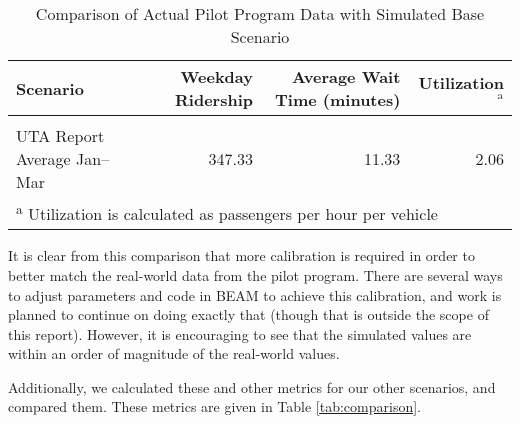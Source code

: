 \documentclass[3p, authoryear]{elsarticle} %
\begin{document}
\begin{table}[H]

\caption{\label{tab:UTAComparison}Comparison of Actual Pilot Program Data with Simulated Base Scenario}
\centering
\begin{tabular}[t]{lrrr}
\toprule
Scenario & Weekday Ridership & Average Wait Time (minutes) & Utilization$^{\text{a}}$\\
\midrule
\cellcolor{gray!6}{South SL County only} & \cellcolor{gray!6}{1006.00} & \cellcolor{gray!6}{5.82} & \cellcolor{gray!6}{4.14}\\
UTA Report Average Jan--Mar & 347.33 & 11.33 & 2.06\\
\bottomrule
\multicolumn{4}{l}{\textsuperscript{a} Utilization is calculated as passengers per hour per vehicle}\\
\end{tabular}
\end{table}

It is clear from this comparison that more calibration is required in order to better match the real-world data from the pilot program. There are several ways to adjust parameters and code in BEAM to achieve this calibration, and work is planned to continue on doing exactly that (though that is outside the scope of this report). However, it is encouraging to see that the simulated values are within an order of magnitude of the real-world values.

Additionally, we calculated these and other metrics for our other scenarios, and compared them. These metrics are given in Table \ref{tab:comparison}.

\begin{table}[H]

\caption{\label{tab:comparison}Comparison of Simulated Scenarios}
\centering
{}
\end{table}
\end{document}
